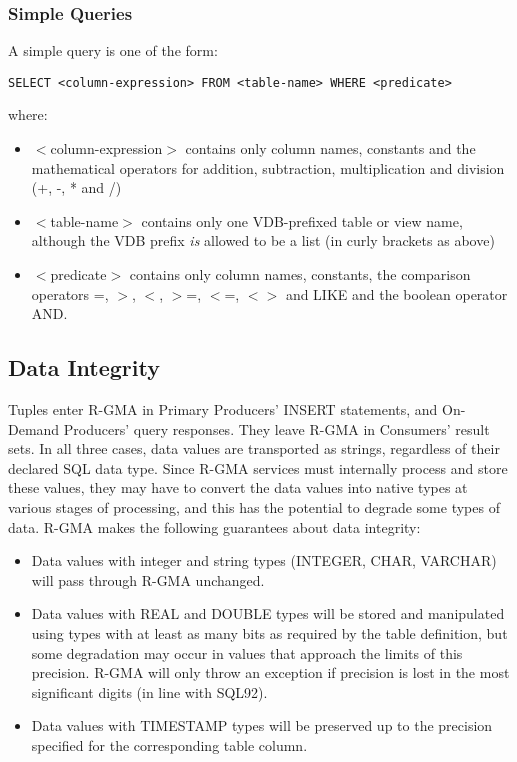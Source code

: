 \subsubsection{Simple Queries}\label{sec:SQLSimpleQueries}

A simple query is one of the form:

\begin{verbatim}
SELECT <column-expression> FROM <table-name> WHERE <predicate>
\end{verbatim}

where:

\begin{itemize}
\item $<$column-expression$>$ contains only column names, constants and the
mathematical operators for addition, subtraction, multiplication and division
(+, -, * and /)
\item $<$table-name$>$ contains only one VDB-prefixed table or view name,
although the VDB prefix \textit{is} allowed to be a list (in curly brackets as
above)
\item $<$predicate$>$ contains only column names, constants, the comparison
operators =, $>$, $<$, $>$=, $<$=, $<>$ and LIKE and the boolean operator AND.
\end{itemize}

\subsection{Data Integrity}

Tuples enter R-GMA in Primary Producers' INSERT statements, and
On-Demand Producers' query responses. They leave R-GMA in Consumers'
result sets. In all three cases, data values are transported as strings,
regardless of their declared SQL data type. Since R-GMA services
must internally process and store these values, they may have to convert
the data values into native types at various stages of processing, and this
has the potential to degrade some types of data. R-GMA makes the following
guarantees about data integrity:

\begin{itemize}
\item Data values with integer and string types (INTEGER, CHAR,
VARCHAR) will pass through R-GMA unchanged.
\item Data values with REAL and DOUBLE types will be stored and
manipulated using types with at least as many bits as required by the
table definition, but some degradation may occur in values that
approach the limits of this precision. R-GMA will only throw an exception if
precision is lost in the most significant digits (in line with SQL92).
\item Data values with TIMESTAMP types will be preserved up to the
precision specified for the corresponding table column.
\end{itemize}
